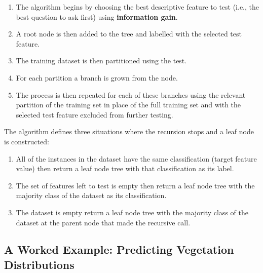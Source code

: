 \documentclass[xcolor={table}]{beamer}
\newcommand{\keyword}[1]{\alert{\textbf{#1}}\index{#1}}
\begin{document}
\begin{frame}
\begin{enumerate}
	\item The algorithm begins by choosing the best descriptive feature to test (i.e., the best question to ask first) using \keyword{information gain}. 
	\item  A root node is then added to the tree and labelled with the selected test feature. 
	\item The training dataset is then partitioned using the test. 
	\item For each partition a branch is grown from the node. 
	\item The process is then repeated for each of these branches using the relevant partition of the training set in place of the full training set and with the selected test feature excluded from further testing. 
	\end{enumerate}
\end{frame}

\begin{frame}
The algorithm defines three situations where the recursion stops and a leaf node is constructed:
\begin{enumerate}
	\item All of the instances in the dataset have the same classification (target feature value) then return a leaf node tree with that classification as its label.
	\item The set of features left to test is empty then return a leaf node tree with the majority class of the dataset as its classification.
	\item The dataset is empty return  a leaf node tree with the majority class of the dataset at the parent node that made the recursive call. 			
\end{enumerate}
\end{frame}

\subsection{A Worked Example: Predicting Vegetation Distributions}
\end{document}
